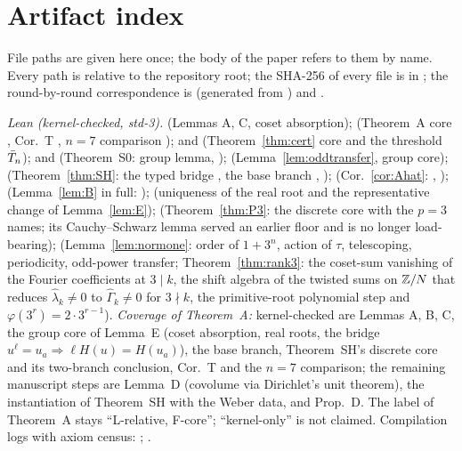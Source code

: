 \documentclass[11pt]{amsart}
\theoremstyle{remark}\newtheorem{remark}[theorem]{Remark}
\theoremstyle{definition}\newtheorem{definition}[theorem]{Definition}
\theoremstyle{definition}\newtheorem{algorithm}[theorem]{Algorithm}
\begin{document}
\section{Artifact index}\label{app:F}
File paths are given here once; the body of the paper refers to them by name. Every path is relative to the repository root; the SHA-256 of every file is in ; the round-by-round correspondence is  (generated from ) and .

\emph{Lean (kernel-checked, std-3).}  (Lemmas A, C, coset absorption);  (Theorem~A core , Cor.~T , $n=7$ comparison );  and  (Theorem~\ref{thm:cert} core and the threshold $\bar T_n$);  and  (Theorem~S0: group lemma, );  (Lemma~\ref{lem:oddtransfer}, group core);  (Theorem~\ref{thm:SH}: the typed bridge , the base branch , );  (Cor.~\ref{cor:Ahat}: , );  (Lemma~\ref{lem:B} in full: );  (uniqueness of the real root and the representative change of Lemma~\ref{lem:E});  (Theorem~\ref{thm:P3}: the discrete core with the $p=3$ names; its Cauchy--Schwarz lemma served an earlier floor and is no longer load-bearing);  (Lemma~\ref{lem:normone}: order of $1+3^n$, action of $\tau$, telescoping, periodicity, odd-power transfer; Theorem~\ref{thm:rank3}: the coset-sum vanishing of the Fourier coefficients at $3\mid k$, the shift algebra of the twisted sums on $\mathbb{Z}/N$ that reduces $\hat\lambda_k\ne0$ to $\hat\Gamma_k\ne0$ for $3\nmid k$, the primitive-root polynomial step and $\varphi(3^r)=2\cdot3^{r-1}$). \emph{Coverage of Theorem~A:} kernel-checked are Lemmas A, B, C, the group core of Lemma~E (coset absorption, real roots, the bridge $u^\ell=u_a\Rightarrow\ell H(u)=H(u_a)$), the base branch, Theorem~SH's discrete core and its two-branch conclusion, Cor.~T and the $n=7$ comparison; the remaining manuscript steps are Lemma~D (covolume via Dirichlet's unit theorem), the instantiation of Theorem~SH with the Weber data, and Prop.~D. The label of Theorem~A stays ``L-relative, F-core''; ``kernel-only'' is not claimed. Compilation logs with axiom census: ; .
\end{document}
